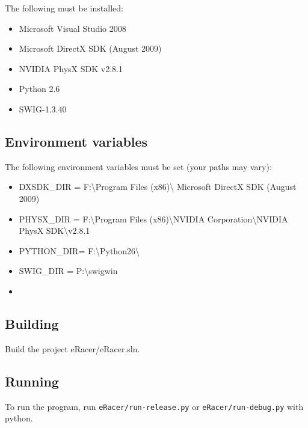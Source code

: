\documentclass[11pt]{article}
\begin{document}
The following must be installed:
  
\begin{itemize}
  \item Microsoft Visual Studio 2008
  \item Microsoft DirectX SDK (August 2009)
  \item NVIDIA PhysX SDK v2.8.1
  \item Python 2.6
  \item SWIG-1.3.40
\end{itemize}  
  
\subsection{Environment variables}

The following environment variables
must be set (your paths may vary):

\begin{itemize}
  \item DXSDK_DIR = F:\textbackslash Program Files (x86)\textbackslash
  Microsoft DirectX SDK (August 2009)
  \item PHYSX_DIR = F:\textbackslash Program Files (x86)\textbackslash NVIDIA
  Corporation\textbackslash NVIDIA PhysX SDK\textbackslash v2.8.1
  \item PYTHON_DIR= F:\textbackslash Python26\textbackslash
  \item SWIG_DIR  = P:\textbackslash swigwin\item 
\end{itemize}  
 
\subsection{Building}

Build the project eRacer/eRacer.sln.

\subsection{Running}  
  
To run the program, run \texttt{eRacer/run-release.py} or
\texttt{eRacer/run-debug.py} with python.
\end{document}
